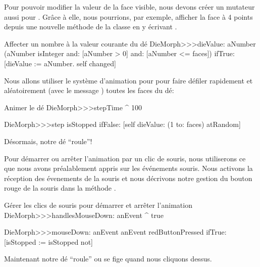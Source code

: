 \documentclass[a4paper,10pt,twoside]{book}
\begin{document}
Pour pouvoir modifier la valeur de la face visible, nous devons
cr\'eer un mutateur aussi pour . 
Gr\^ace \`a elle, nous pourrions, par exemple, afficher la face \`a 4
points depuis une nouvelle m\'ethode de la classe en y \'ecrivant
.

\begin{method}{Affecter un nombre \`a la valeur courante du d\'e}
DieMorph>>>dieValue: aNumber
	(aNumber isInteger
			and: [aNumber > 0]
			and: [aNumber <= faces])
		ifTrue:
			[dieValue := aNumber.
			self changed]
\end{method}

Nous allons utiliser le syst\`eme d'animation pour 
pour faire d\'efiler rapidement 
et al\'eatoirement (avec le message )
toutes les faces du d\'e:
\begin{methods}{Animer le d\'e}
DieMorph>>>stepTime
	^ 100

DieMorph>>>step
	isStopped ifFalse: [self dieValue: (1 to: faces) atRandom]
\end{methods}
D\'esormais, notre d\'e ``roule''!

Pour d\'emarrer ou arr\^eter  l'animation par un clic de souris, nous
utiliserons ce que nous avons pr\'ealablement appris sur les
\'ev\'enements souris.
Nous activons la r\'eception des \'evenements de la souris et nous
d\'ecrivons notre gestion du bouton rouge de la souris dans la
m\'ethode .       

\begin{methods}{G\'erer les clics de souris pour d\'emarrer et arr\^eter l'animation}
DieMorph>>>handlesMouseDown: anEvent
	^ true

DieMorph>>>mouseDown: anEvent
	anEvent redButtonPressed
		ifTrue: [isStopped := isStopped not]
\end{methods}

Maintenant notre d\'e ``roule'' ou se fige quand nous cliquons dessus.



\end{document}
